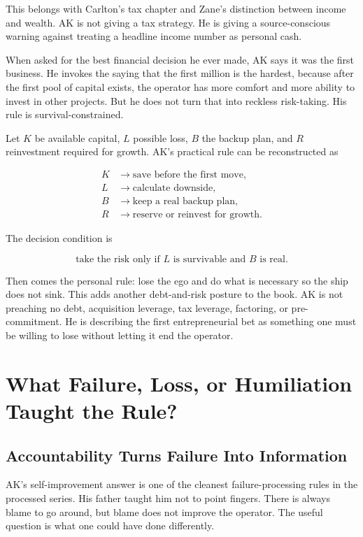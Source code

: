\documentclass[11pt,oneside]{book}
\begin{document}
This belongs with Carlton's tax chapter and Zane's distinction between income and wealth. AK is not giving a tax strategy. He is giving a source-conscious warning against treating a headline income number as personal cash.

When asked for the best financial decision he ever made, AK says it was the first business. He invokes the saying that the first million is the hardest, because after the first pool of capital exists, the operator has more comfort and more ability to invest in other projects. But he does not turn that into reckless risk-taking. His rule is survival-constrained.

Let \(K\) be available capital, \(L\) possible loss, \(B\) the backup plan, and \(R\) reinvestment required for growth. AK's practical rule can be reconstructed as

\begin{align}
K &\longrightarrow \text{save before the first move},\\
L &\longrightarrow \text{calculate downside},\\
B &\longrightarrow \text{keep a real backup plan},\\
R &\longrightarrow \text{reserve or reinvest for growth}.
\end{align}

The decision condition is

\begin{equation}
\text{take the risk only if }L\text{ is survivable and }B\text{ is real}.
\end{equation}

Then comes the personal rule: lose the ego and do what is necessary so the ship does not sink. This adds another debt-and-risk posture to the book. AK is not preaching no debt, acquisition leverage, tax leverage, factoring, or pre-commitment. He is describing the first entrepreneurial bet as something one must be willing to lose without letting it end the operator.

\chapter{What Failure, Loss, or Humiliation Taught the Rule?}

\section{Accountability Turns Failure Into Information}

AK's self-improvement answer is one of the cleanest failure-processing rules in the processed series. His father taught him not to point fingers. There is always blame to go around, but blame does not improve the operator. The useful question is what one could have done differently.
\end{document}
